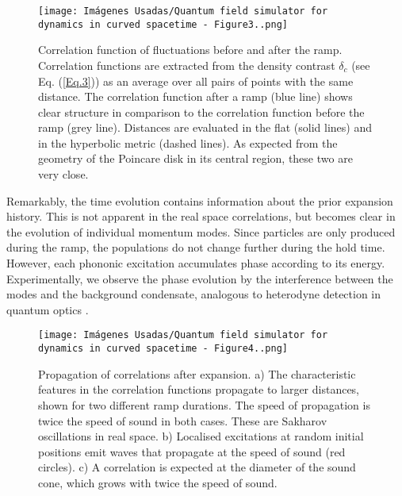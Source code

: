 \documentclass[11pt,twocolumn,letterpaper]{article}
\newcounter{ns}
\begin{document}
\begin{figure} [ht]
    \centering
    \texttt{[image: Imágenes Usadas/Quantum field simulator for dynamics in curved spacetime - Figure3..png]}
    \caption{Correlation function of fluctuations before and after the ramp. Correlation functions are extracted from the density contrast $\delta_{c}$ (see Eq. (\ref{Eq.3})) as an average over all pairs of points with the same distance. The correlation function after a ramp (blue line) shows clear structure in comparison to the correlation function before the ramp (grey line). Distances are evaluated in the flat (solid lines) and in the hyperbolic metric (dashed lines). As expected from the geometry of the Poincare disk in its central region, these two are very close.}
    \label{Figure3}
\end{figure}

Remarkably, the time evolution contains information about the prior expansion history. This is not apparent in the real space correlations, but becomes clear in the evolution of individual momentum modes. Since particles are only produced during the ramp, the populations do not change further during the hold time. However, each phononic excitation accumulates phase according to its energy. Experimentally, we observe the phase evolution by the interference between the modes and the background condensate, analogous to heterodyne detection in quantum optics \cite{Lb.30, Lb.31, Lb.32, Lb.33}.\\

\begin{figure}[ht]
    \centering
    \texttt{[image: Imágenes Usadas/Quantum field simulator for dynamics in curved spacetime - Figure4..png]}
    \caption{Propagation of correlations after expansion. a) The characteristic features in the correlation functions propagate to larger distances, shown for two different ramp durations. The speed of propagation is twice the speed of sound in both cases. These are Sakharov oscillations in real space. b) Localised excitations at random initial positions emit waves that propagate at the speed of sound (red circles). c) A correlation is expected at the diameter of the sound cone, which grows with twice the speed of sound.
}
    \label{Figure4}
\end{figure}
\end{document}
